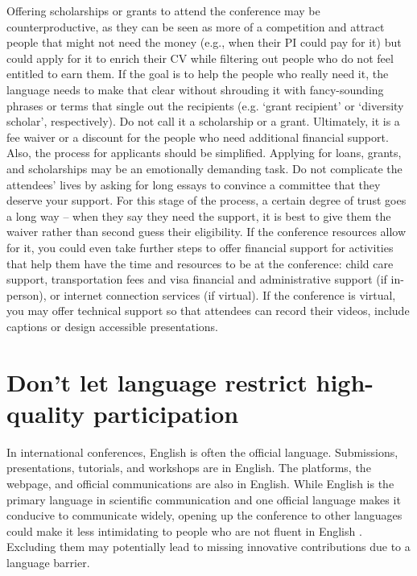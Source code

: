 \documentclass[10pt,letterpaper]{article}
\begin{document}
Offering scholarships or grants to attend the conference may be counterproductive, as they can be seen as more of a competition and attract people that might not need the money (e.g., when their PI could pay for it) but could apply for it to enrich their CV while filtering out people who do not feel entitled to earn them. If the goal is to help the people who really need it, the language needs to make that clear without shrouding it with fancy-sounding phrases or terms that single out the recipients (e.g. `grant recipient' or `diversity scholar', respectively). Do not call it a scholarship or a grant. Ultimately, it is a fee waiver or a discount for the people who need additional financial support. Also, the process for applicants should be simplified. Applying for loans, grants, and scholarships may be an emotionally demanding task. Do not complicate the attendees' lives by asking for long essays to convince a committee that they deserve your support. For this stage of the process, a certain degree of trust goes a long way -- when they say they need the support, it is best to give them the waiver rather than second guess their eligibility. If the conference resources allow for it, you could even take further steps to offer financial support for activities that help them have the time and resources to be at the conference: child care support, transportation fees and visa financial and administrative support (if in-person), or internet connection services (if virtual). If the conference is virtual, you may offer technical support so that attendees can record their videos, include captions or design accessible presentations.

\section{Don't let language restrict high-quality participation}
\label{rule_language}

In international conferences, English is often the official language. Submissions, presentations, tutorials, and workshops are in English. The platforms, the webpage, and official communications are also in English. While English is the primary language in scientific communication and one official language makes it conducive to communicate widely, opening up the conference to other languages could make it less intimidating to people who are not fluent in English \cite{ninerBetterWhomLeveling2021}. Excluding them may potentially lead to missing innovative contributions due to a language barrier. 
\end{document}
